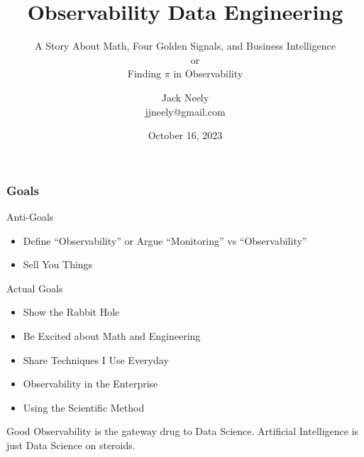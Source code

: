 

\title{Observability Data Engineering}
\subtitle{A Story About Math, Four Golden Signals, and Business Intelligence\\
~~~~or\\
Finding $\pi$ in Observability}
\author{Jack Neely\\ jjneely@gmail.com}

\date{October 16, 2023}

\newcommand{\hcancel}[1]{%
    \tikz[baseline=(tocancel.base)]{%
        \node[inner sep=0pt,outer sep=0pt] (tocancel) {#1};
        \draw[red, very thick] (tocancel.south west) -- (tocancel.north east);
    }%
}%
\newcommand{\icancel}[1]{%
    \tikz[baseline=(tocancel.base)]{%
        \node[inner sep=0pt,outer sep=0pt] (tocancel) {#1};
        \draw[red, very thick] (tocancel.south west) -- (tocancel.north east);
        \draw[red, very thick] (tocancel.south east) -- (tocancel.north west);
    }%
}%

\usepackage[most]{tcolorbox}



\maketitle

\begin{frame}
    \frametitle{Goals}

Anti-Goals
    \begin{itemize}
        \item Define ``Observability'' or Argue ``Monitoring'' vs ``Observability''
        \item Sell You Things
    \end{itemize}

Actual Goals
    \begin{itemize}
        \item Show the Rabbit Hole
        \item Be Excited about Math and Engineering
        \item Share Techniques I Use Everyday
        \item Observability in the Enterprise
        \item Using the Scientific Method
    \end{itemize}

    Good Observability is the gateway drug to Data Science.  Artificial
    Intelligence is just Data Science on steroids.
\end{frame}

